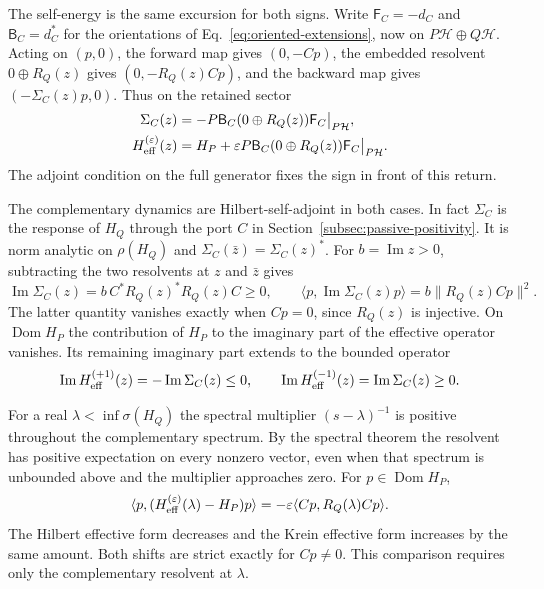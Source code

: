 \documentclass[11pt]{article}
\theoremstyle{definition}
\begin{document}
The self-energy is the same excursion for both signs. Write $\mathsf F_C=-d_C$ and $\mathsf B_C=d_C^*$ for the orientations of Eq.~\eqref{eq:oriented-extensions}, now on $P\mathcal H\oplus Q\mathcal H$. Acting on $(p,0)$, the forward map gives $(0,-Cp)$, the embedded resolvent $0\oplus R_Q(z)$ gives $(0,-R_Q(z)Cp)$, and the backward map gives $(-\Sigma_C(z)p,0)$. Thus on the retained sector
\begin{equation}
 \begin{aligned}
 \Sigma_C(z)&=-P\mathsf B_C(0\oplus R_Q(z))\mathsf F_C\big|_{P\mathcal H},\\
 H_{\rm eff}^{(\varepsilon)}(z)&=H_P+\varepsilon P\mathsf B_C(0\oplus R_Q(z))\mathsf F_C\big|_{P\mathcal H}.
 \end{aligned}
 \label{eq:signed-oriented-excursion}
\end{equation}
The adjoint condition on the full generator fixes the sign in front of this return.

The complementary dynamics are Hilbert-self-adjoint in both cases. In fact $\Sigma_C$ is the response of $H_Q$ through the port $C$ in Section~\ref{subsec:passive-positivity}. It is norm analytic on $\rho(H_Q)$ and $\Sigma_C(\bar z)=\Sigma_C(z)^*$. For $b=\operatorname{Im}z>0$, subtracting the two resolvents at $z$ and $\bar z$ gives
\begin{equation}
 \operatorname{Im}\Sigma_C(z)=b\,C^*R_Q(z)^*R_Q(z)C\ge0,\qquad
 \langle p,\operatorname{Im}\Sigma_C(z)p\rangle=b\|R_Q(z)Cp\|^2 .
 \label{eq:signed-self-energy-imaginary}
\end{equation}
The latter quantity vanishes exactly when $Cp=0$, since $R_Q(z)$ is injective. On $\operatorname{Dom}H_P$ the contribution of $H_P$ to the imaginary part of the effective operator vanishes. Its remaining imaginary part extends to the bounded operator
\begin{equation}
 \operatorname{Im}H_{\rm eff}^{(+1)}(z)=-\operatorname{Im}\Sigma_C(z)\le0,\qquad
 \operatorname{Im}H_{\rm eff}^{(-1)}(z)=\operatorname{Im}\Sigma_C(z)\ge0 .
 \label{eq:signed-effective-imaginary}
\end{equation}

For a real $\lambda<\inf\sigma(H_Q)$ the spectral multiplier $(s-\lambda)^{-1}$ is positive throughout the complementary spectrum. By the spectral theorem the resolvent has positive expectation on every nonzero vector, even when that spectrum is unbounded above and the multiplier approaches zero. For $p\in\operatorname{Dom}H_P$,
\begin{equation}
 \langle p,(H_{\rm eff}^{(\varepsilon)}(\lambda)-H_P)p\rangle
 =-\varepsilon\langle Cp,R_Q(\lambda)Cp\rangle .
 \label{eq:signed-static-return}
\end{equation}
The Hilbert effective form decreases and the Krein effective form increases by the same amount. Both shifts are strict exactly for $Cp\ne0$. This comparison requires only the complementary resolvent at $\lambda$.
\end{document}
